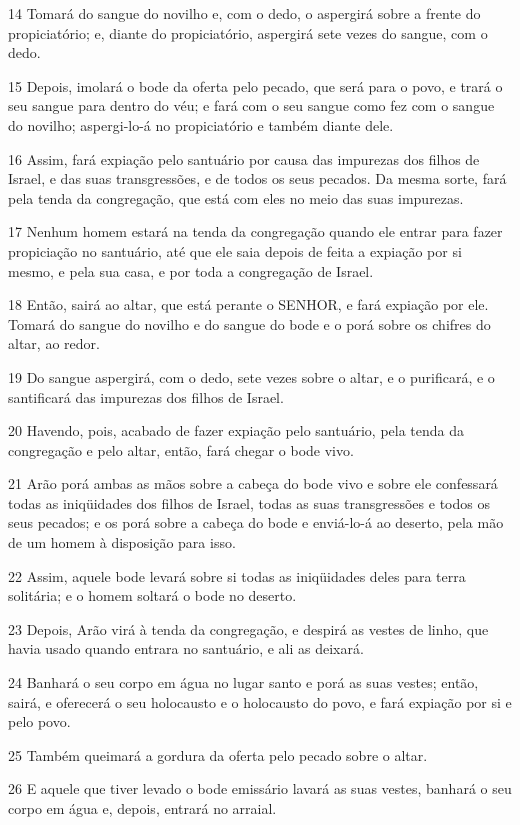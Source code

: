 \par 14 Tomará do sangue do novilho e, com o dedo, o aspergirá sobre a frente do propiciatório; e, diante do propiciatório, aspergirá sete vezes do sangue, com o dedo.
\par 15 Depois, imolará o bode da oferta pelo pecado, que será para o povo, e trará o seu sangue para dentro do véu; e fará com o seu sangue como fez com o sangue do novilho; aspergi-lo-á no propiciatório e também diante dele.
\par 16 Assim, fará expiação pelo santuário por causa das impurezas dos filhos de Israel, e das suas transgressões, e de todos os seus pecados. Da mesma sorte, fará pela tenda da congregação, que está com eles no meio das suas impurezas.
\par 17 Nenhum homem estará na tenda da congregação quando ele entrar para fazer propiciação no santuário, até que ele saia depois de feita a expiação por si mesmo, e pela sua casa, e por toda a congregação de Israel.
\par 18 Então, sairá ao altar, que está perante o SENHOR, e fará expiação por ele. Tomará do sangue do novilho e do sangue do bode e o porá sobre os chifres do altar, ao redor.
\par 19 Do sangue aspergirá, com o dedo, sete vezes sobre o altar, e o purificará, e o santificará das impurezas dos filhos de Israel.
\par 20 Havendo, pois, acabado de fazer expiação pelo santuário, pela tenda da congregação e pelo altar, então, fará chegar o bode vivo.
\par 21 Arão porá ambas as mãos sobre a cabeça do bode vivo e sobre ele confessará todas as iniqüidades dos filhos de Israel, todas as suas transgressões e todos os seus pecados; e os porá sobre a cabeça do bode e enviá-lo-á ao deserto, pela mão de um homem à disposição para isso.
\par 22 Assim, aquele bode levará sobre si todas as iniqüidades deles para terra solitária; e o homem soltará o bode no deserto.
\par 23 Depois, Arão virá à tenda da congregação, e despirá as vestes de linho, que havia usado quando entrara no santuário, e ali as deixará.
\par 24 Banhará o seu corpo em água no lugar santo e porá as suas vestes; então, sairá, e oferecerá o seu holocausto e o holocausto do povo, e fará expiação por si e pelo povo.
\par 25 Também queimará a gordura da oferta pelo pecado sobre o altar.
\par 26 E aquele que tiver levado o bode emissário lavará as suas vestes, banhará o seu corpo em água e, depois, entrará no arraial.
